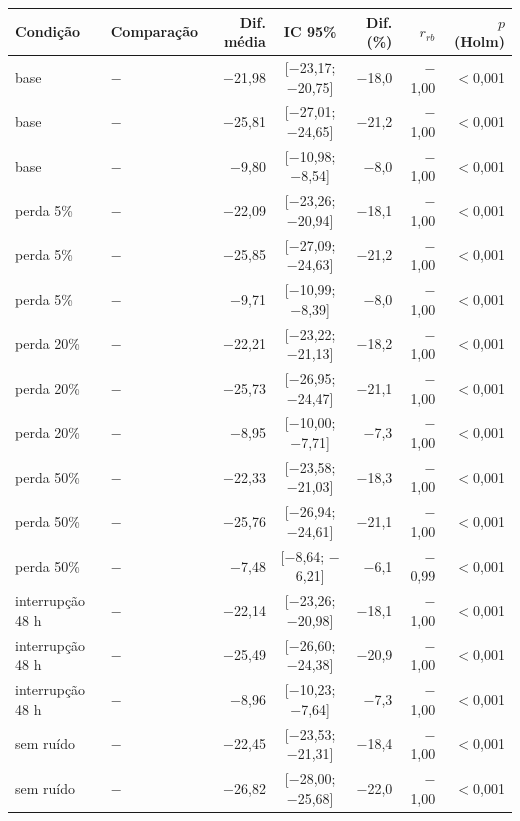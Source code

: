 \begin{tabular}{@{}llrcrrr@{}}
\toprule
Condição & Comparação & Dif. média & IC 95\% & Dif. (\%) & $r_{rb}$ & $p$ (Holm) \\
\midrule
base & \polBOR{} $-$ \polA{} & $-$21,98 & [$-$23,17; $-$20,75] & $-$18,0 & $-$1,00 & $<$0,001 \\
base & \polC{} $-$ \polA{} & $-$25,81 & [$-$27,01; $-$24,65] & $-$21,2 & $-$1,00 & $<$0,001 \\
base & \polD{} $-$ \polA{} & $-$9,80 & [$-$10,98; $-$8,54] & $-$8,0 & $-$1,00 & $<$0,001 \\
perda 5\% & \polBOR{} $-$ \polA{} & $-$22,09 & [$-$23,26; $-$20,94] & $-$18,1 & $-$1,00 & $<$0,001 \\
perda 5\% & \polC{} $-$ \polA{} & $-$25,85 & [$-$27,09; $-$24,63] & $-$21,2 & $-$1,00 & $<$0,001 \\
perda 5\% & \polD{} $-$ \polA{} & $-$9,71 & [$-$10,99; $-$8,39] & $-$8,0 & $-$1,00 & $<$0,001 \\
perda 20\% & \polBOR{} $-$ \polA{} & $-$22,21 & [$-$23,22; $-$21,13] & $-$18,2 & $-$1,00 & $<$0,001 \\
perda 20\% & \polC{} $-$ \polA{} & $-$25,73 & [$-$26,95; $-$24,47] & $-$21,1 & $-$1,00 & $<$0,001 \\
perda 20\% & \polD{} $-$ \polA{} & $-$8,95 & [$-$10,00; $-$7,71] & $-$7,3 & $-$1,00 & $<$0,001 \\
perda 50\% & \polBOR{} $-$ \polA{} & $-$22,33 & [$-$23,58; $-$21,03] & $-$18,3 & $-$1,00 & $<$0,001 \\
perda 50\% & \polC{} $-$ \polA{} & $-$25,76 & [$-$26,94; $-$24,61] & $-$21,1 & $-$1,00 & $<$0,001 \\
perda 50\% & \polD{} $-$ \polA{} & $-$7,48 & [$-$8,64; $-$6,21] & $-$6,1 & $-$0,99 & $<$0,001 \\
interrupção 48 h & \polBOR{} $-$ \polA{} & $-$22,14 & [$-$23,26; $-$20,98] & $-$18,1 & $-$1,00 & $<$0,001 \\
interrupção 48 h & \polC{} $-$ \polA{} & $-$25,49 & [$-$26,60; $-$24,38] & $-$20,9 & $-$1,00 & $<$0,001 \\
interrupção 48 h & \polD{} $-$ \polA{} & $-$8,96 & [$-$10,23; $-$7,64] & $-$7,3 & $-$1,00 & $<$0,001 \\
sem ruído & \polBOR{} $-$ \polA{} & $-$22,45 & [$-$23,53; $-$21,31] & $-$18,4 & $-$1,00 & $<$0,001 \\
sem ruído & \polC{} $-$ \polA{} & $-$26,82 & [$-$28,00; $-$25,68] & $-$22,0 & $-$1,00 & $<$0,001 \\

\end{tabular}
